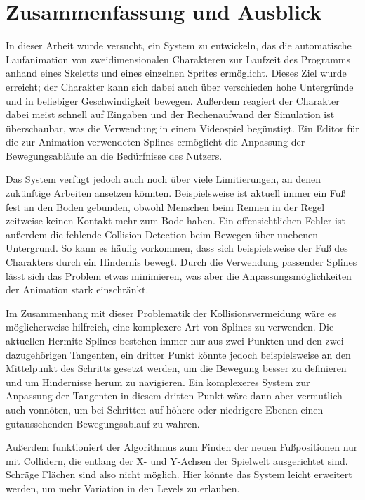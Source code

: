 \chapter{Zusammenfassung und Ausblick}
In dieser Arbeit wurde versucht, ein System zu entwickeln, das die automatische Laufanimation von zweidimensionalen Charakteren zur Laufzeit des Programms anhand eines Skeletts und eines einzelnen Sprites ermöglicht. Dieses Ziel wurde erreicht; der Charakter kann sich dabei auch über verschieden hohe Untergründe und in beliebiger Geschwindigkeit bewegen. Außerdem reagiert der Charakter dabei meist schnell auf Eingaben und der Rechenaufwand der Simulation ist überschaubar, was die Verwendung in einem Videospiel begünstigt. Ein Editor für die zur Animation verwendeten Splines ermöglicht die Anpassung der Bewegungsabläufe an die Bedürfnisse des Nutzers.

Das System verfügt jedoch auch noch über viele Limitierungen, an denen zukünftige Arbeiten ansetzen könnten. Beispielsweise ist aktuell immer ein Fuß fest an den Boden gebunden, obwohl Menschen beim Rennen in der Regel zeitweise keinen Kontakt mehr zum Bode haben. Ein offensichtlichen Fehler ist außerdem die fehlende Collision Detection beim Bewegen über unebenen Untergrund. So kann es häufig vorkommen, dass sich beispielsweise der Fuß des Charakters durch ein Hindernis bewegt. Durch die Verwendung passender Splines lässt sich das Problem etwas minimieren, was aber die Anpassungsmöglichkeiten der Animation stark einschränkt.

Im Zusammenhang mit dieser Problematik der Kollisionsvermeidung wäre es möglicherweise hilfreich, eine komplexere Art von Splines zu verwenden. Die aktuellen Hermite Splines bestehen immer nur aus zwei Punkten und den zwei dazugehörigen Tangenten, ein dritter Punkt könnte jedoch beispielsweise an den Mittelpunkt des Schritts gesetzt werden, um die Bewegung besser zu definieren und um Hindernisse herum zu navigieren. Ein komplexeres System zur Anpassung der Tangenten in diesem dritten Punkt wäre dann aber vermutlich auch vonnöten, um bei Schritten auf höhere oder niedrigere Ebenen einen gutaussehenden Bewegungsablauf zu wahren.

Außerdem funktioniert der Algorithmus zum Finden der neuen Fußpositionen nur mit Collidern, die entlang der X- und Y-Achsen der Spielwelt ausgerichtet sind. Schräge Flächen sind also nicht möglich. Hier könnte das System leicht erweitert werden, um mehr Variation in den Levels zu erlauben.




